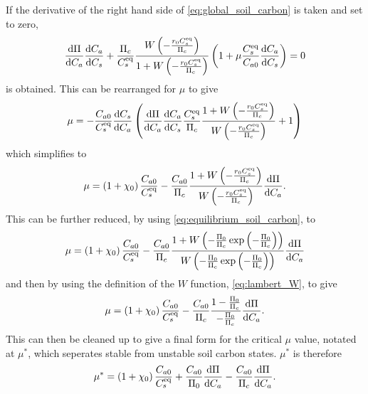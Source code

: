 If the derivative of the right hand side of \cref{eq:global_soil_carbon} is taken and set to zero, 
\begin{equation}
  \label{eq:soil_carbon_lambda}
  \dv{\Pi}{C_a}\dv{C_a}{C_s} + \frac{\Pi_c}{C_s^{\mathrm{eq}}} \frac{W\left(-\frac{r_0C_s^{\mathrm{eq}}}{\Pi_c}\right)}{1+W\left(-\frac{r_0C_s^{\mathrm{eq}}}{\Pi_c}\right)} \left(
    1 + \mu \frac{C_s^{\mathrm{eq}}}{C_{a0}} \dv{C_a}{C_s}\right) = 0
\end{equation}
is obtained. This can be rearranged for $\mu$ to give
\begin{equation}
  \label{eq:critical_mu}
  \mu = -\frac{C_{a0}}{C_{s}^{\mathrm{eq}}}\dv{C_s}{C_a}\left(\dv{\Pi}{C_a}\dv{C_a}{C_s} \frac{C_s^{\mathrm{eq}}}{\Pi_c}\frac{1+W\left(-\frac{r_0C_s^{\mathrm{eq}}}{\Pi_c}\right)}{W\left(-\frac{r_0C_s^{\mathrm{eq}}}{\Pi_c}\right)} + 1 \right)
\end{equation}
which simplifies to
\begin{equation}
  \label{eq:critical_mu_simple_ocean}
  \mu = \left(1+\chi_0\right) \frac{C_{a0}}{C_{s}^{\mathrm{eq}}} -
  \frac{C_{a0}}{\Pi_c}\frac{1+W\left(-\frac{r_0C_s^{\mathrm{eq}}}{\Pi_c}\right)}{W\left(-\frac{r_0C_s^{\mathrm{eq}}}{\Pi_c}\right)}\dv{\Pi}{C_a}.
\end{equation}
This can be further reduced, by using \cref{eq:equilibrium_soil_carbon}, to
\begin{equation*}
  \mu = \left(1+\chi_0\right) \frac{C_{a0}}{C_{s}^{\mathrm{eq}}} -
  \frac{C_{a0}}{\Pi_c}
  \frac{1+W\left(-\frac{\Pi_0}{\Pi_c}\exp\left(-\frac{\Pi_0}{\Pi_c}\right)\right)}
  {W\left(-\frac{\Pi_0}{\Pi_c}\exp\left(-\frac{\Pi_0}{\Pi_c}\right)\right)}\dv{\Pi}{C_a} 
\end{equation*}
and then by using the definition of the $W$ function, \cref{eq:lambert_W}, to give
\begin{equation*}
  \mu = \left(1+\chi_0\right) \frac{C_{a0}}{C_{s}^{\mathrm{eq}}} -
  \frac{C_{a0}}{\Pi_c}
  \frac{1-\frac{\Pi_0}{\Pi_c}}{-\frac{\Pi_0}{\Pi_c}}\dv{\Pi}{C_a}.
\end{equation*}
This can then be cleaned up to give a final form for the critical $\mu$ value, notated at $\mu^*$, which seperates stable from unstable soil
carbon states. $\mu^*$ is therefore
\begin{equation}
  \label{eq:critical_mu_simple_ocean_in_terms_of_npp}
  \mu^* = \left(1+\chi_0\right) \frac{C_{a0}}{C_{s}^{\mathrm{eq}}} +
  \frac{C_{a0}}{\Pi_0} \dv{\Pi}{C_a} - \frac{C_{a0}}{\Pi_c}\dv{\Pi}{C_a}.
\end{equation}

